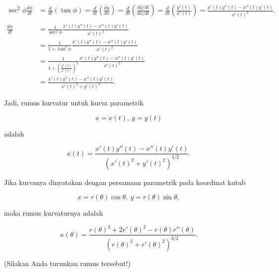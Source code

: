 \documentclass[a4paper,11pt,oneside,enabledeprecatedfontcommands]{scrbook}
\newenvironment{eulernotebook}{}{}
\newenvironment{eulercomment}{\par\medskip\noindent}{\par\medskip}
\newenvironment{eulerformula}{}{}
\begin{document}
\begin{eulernotebook}
\begin{eulerformula}
\[
\begin{aligned}\sec^2\phi\frac{d\phi}{dt} &= \frac{d}{dt}\left(\tan\phi\right)= \frac{d}{dt}\left(\frac{dy}{dx}\right)= \frac{d}{dt}\left(\frac{dy/dt}{dx/dt}\right)= \frac{d}{dt}\left(\frac{y'(t)}{x'(t)}\right)=\frac{x'(t)y''(t)-x''(t)y'(t)}{x'(t)^2}.\\ & \\ \frac{d\phi}{dt} &= \frac{1}{\sec^2\phi}\frac{x'(t)y''(t)-x''(t)y'(t)}{x'(t)^2}\\ &= \frac{1}{1+\tan^2\phi}\frac{x'(t)y''(t)-x''(t)y'(t)}{x'(t)^2}\\ &= \frac{1}{1+\left(\frac{y'(t)}{x'(t)}\right)^2}\frac{x'(t)y''(t)-x''(t)y'(t)}{x'(t)^2}\\ &= \frac{x'(t)y''(t)-x''(t)y'(t)}{x'(t)^2+y'(t)^2}.\end{aligned}
\]
\end{eulerformula}
\begin{eulercomment}
Jadi, rumus kurvatur untuk kurva parametrik
\end{eulercomment}
\begin{eulerformula}
\[
x=x(t),\ y=y(t)
\]
\end{eulerformula}
\begin{eulercomment}
adalah
\end{eulercomment}
\begin{eulerformula}
\[
\kappa(t) = \frac{x'(t)y''(t)-x''(t)y'(t)}{\left(x'(t)^2+y'(t)^2\right)^{3/2}}.
\]
\end{eulerformula}
\begin{eulercomment}
Jika kurvanya dinyatakan dengan persamaan parametrik pada koordinat kutub
\end{eulercomment}
\begin{eulerformula}
\[
x=r(\theta)\cos\theta,\ y=r(\theta)\sin\theta,
\]
\end{eulerformula}
\begin{eulercomment}
maka rumus kurvaturnya adalah
\end{eulercomment}
\begin{eulerformula}
\[
\kappa(\theta) = \frac{r(\theta)^2+2r'(\theta)^2-r(\theta)r''(\theta)}{\left(r(\theta)^2+r'(\theta)^2\right)^{3/2}}.
\]
\end{eulerformula}
\begin{eulercomment}
(Silakan Anda turunkan rumus tersebut!)


\end{eulercomment}
\end{eulernotebook}
\end{document}
